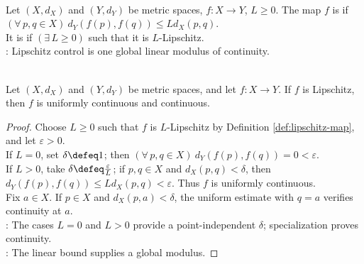 \begin{definition} \label{def:lipschitz-map} \\
Let $(X,d_X)$ and $(Y,d_Y)$ be metric spaces, $f:X\to Y$, $L\geq0$. The map $f$ is  if $(\forall\,p,q\in X)\ d_Y(f(p),f(q))\leq Ld_X(p,q)$.\\
It is  if $(\exists\,L\geq0)$ such that it is $L$-Lipschitz.\\
: Lipschitz control is one global linear modulus of continuity.
\end{definition}

\begin{proposition} \label{prop:lipschitz-implies-uniform-continuity} \\
Let $(X,d_X)$ and $(Y,d_Y)$ be metric spaces, and let $f:X\to Y$. If $f$ is Lipschitz, then $f$ is uniformly continuous and continuous.
\begin{proof}
Choose $L\geq0$ such that $f$ is $L$-Lipschitz by Definition \ref{def:lipschitz-map}, and let $\varepsilon>0$.\\
If $L=0$, set $\delta\defeq1$; then $(\forall\,p,q\in X)\ d_Y(f(p),f(q))=0<\varepsilon$.\\
If $L>0$, take $\delta\defeq\frac{\varepsilon}{L}$; if $p,q\in X$ and $d_X(p,q)<\delta$, then $d_Y(f(p),f(q))\leq Ld_X(p,q)<\varepsilon$. Thus $f$ is uniformly continuous.\\
Fix $a\in X$. If $p\in X$ and $d_X(p,a)<\delta$, the uniform estimate with $q=a$ verifies continuity at $a$.\\
: The cases $L=0$ and $L>0$ provide a point-independent $\delta$; specialization proves continuity.\\
: The linear bound supplies a global modulus.
\end{proof}
\end{proposition}

